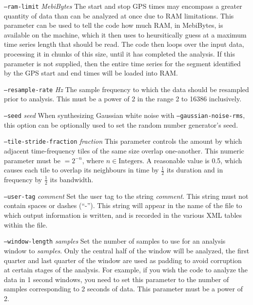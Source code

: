 \documentclass[10pt]{article}
\newcommand{\option}[1]{\texttt{#1}}
\newcommand{\parm}[1]{\textit{#1}}
\newenvironment{entry}%
{\begin{list}{}{\renewcommand{\makelabel}[1]%
{\parbox[b]{\labelwidth}{\makebox[0pt][l]{\textbf{##1}}\\}}%
\setlength{\labelwidth}{1em}%
\setlength{\labelsep}{1em}%
\setlength{\leftmargin}{2em}%
\setlength{\topsep}{\medskipamount}%
\setlength{\itemsep}{\medskipamount}%
\setlength{\parsep}{\medskipamount}%
\setlength{\listparindent}{0pt}}}
{\end{list}}
\begin{document}
\begin{entry}
\begin{entry}
\item[\option{--ram-limit} \parm{MebiBytes}]
The start and stop GPS times may encompass a greater quantity of data than
can be analyzed at once due to RAM limitations.  This parameter can be used
to tell the code how much RAM, in MebiBytes, is available on the machine,
which it then uses to heursitically guess at a maximum time series length
that should be read.  The code then loops over the input data, processing
it in chunks of this size, until it has completed the analysis.  If this
parameter is not supplied, then the entire time series for the segment
identified by the GPS start and end times will be loaded into RAM.

\item[\option{--resample-rate} \parm{Hz}]
The sample frequency to which the data should be resampled prior to
analysis.  This must be a power of 2 in the range \unit{2}{\hertz} to
\unit{16386}{\hertz} inclusively.

\item[\option{--seed} \parm{seed}]
When synthesizing Gaussian white noise with \option{--gaussian-noise-rms},
this option can be optionally used to set the random number generator's
seed.

\item[\option{--tile-stride-fraction} \parm{fraction}]
This parameter controls the amount by which adjacent time-frequency tiles
of the same size overlap one-another.  This numeric parameter must be \(=
2^{-n}\), where \(n \in \mathrm{Integers}\).  A reasonable value is 0.5,
which causes each tile to overlap its neighbours in time by \(\frac{1}{2}\)
its duration and in frequency by \(\frac{1}{2}\) its bandwidth.

\item[\option{--user-tag} \parm{comment}]
Set the user tag to the string \parm{comment}.  This string must not
contain spaces or dashes (``-'').  This string will appear in the name of
the file to which output information is written, and is recorded in the
various XML tables within the file.

\item[\option{--window-length} \parm{samples}]
Set the number of samples to use for an analysis window to \parm{samples}.
Only the central half of the window will be analyzed, the first quarter and
last quarter of the window are used as padding to avoid corruption at
certain stages of the analysis.  For example, if you wish the code to
analyze the data in 1 second windows, you need to set this parameter to the
number of samples corresponding to 2 seconds of data.  This parameter must
be a power of 2.


\end{entry}
\end{entry}
\end{document}
